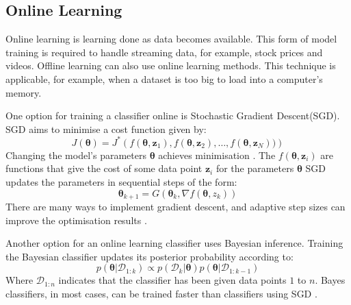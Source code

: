 \subsection{Online Learning}
  Online learning is learning done as data becomes available.
  This form of model training is required to handle streaming data, for example, stock prices and videos.
  Offline learning can also use online learning methods.
  This technique is applicable, for example, when a dataset is too big to load into a computer's memory.

  One option for training a classifier online is Stochastic Gradient Descent(SGD).
  SGD aims to minimise a cost function given by: 
  \begin{equation*}
    J(\pmb{\theta}) = J^*\left(f(\pmb{\theta}, \pmb{z}_1), f(\pmb{\theta}, \pmb{z}_2),\hdots, f(\pmb{\theta}, \mathbf{z}_N))\right)
  \end{equation*}
  Changing the model's parameters $\pmb{\theta}$ achieves minimisation \cite{murphy2012}.
  The $f(\pmb{\theta}, \pmb{z}_i)$ are functions that give the cost of some data point $\pmb{z}_i$ for the parameters $\pmb{\theta}$
  SGD updates the parameters in sequential steps of the form:
  \begin{equation*}
    \pmb{\theta}_{k + 1} = G(\pmb{\theta}_k, \nabla f(\pmb{\theta}, z_k))
  \end{equation*}
  There are many ways to implement gradient descent, and adaptive step sizes can improve the optimisation results \cite{duchi2011}.

  Another option for an online learning classifier uses Bayesian inference.
  Training the Bayesian classifier updates its posterior probability according to:
  \begin{equation*}
    p(\pmb{\theta} | \mathcal{D}_{1:k}) \propto p(\mathcal{D}_k | \pmb{\theta})p(\pmb{\theta} | \mathcal{D}_{1:k-1})
  \end{equation*}
  Where $\mathcal{D}_{1:n}$ indicates that the classifier has been given data points $1$ to $n$.
  Bayes classifiers, in most cases, can be trained faster than classifiers using SGD \cite{murphy2012}.

